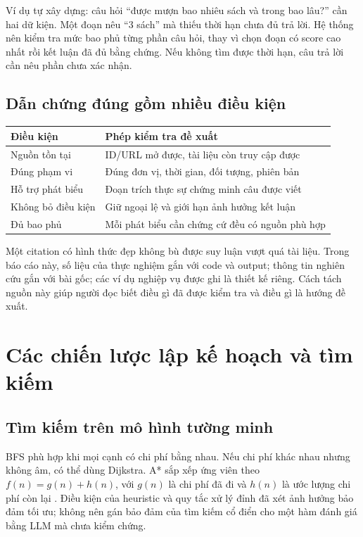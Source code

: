 Ví dụ tự xây dựng: câu hỏi ``được mượn bao nhiêu sách và trong bao lâu?'' cần hai dữ
kiện. Một đoạn nêu ``3 sách'' mà thiếu thời hạn chưa đủ trả lời. Hệ thống nên kiểm tra
mức bao phủ từng phần câu hỏi, thay vì chọn đoạn có score cao nhất rồi kết luận đã
đủ bằng chứng. Nếu không tìm được thời hạn, câu trả lời cần nêu phần chưa xác nhận.

\subsection{Dẫn chứng đúng gồm nhiều điều kiện}
\begin{center}\small
\begin{tabularx}{\linewidth}{@{}p{3.0cm}X@{}}\toprule
\textbf{Điều kiện} & \textbf{Phép kiểm tra đề xuất}\\\midrule
Nguồn tồn tại & ID/URL mở được, tài liệu còn truy cập được\\
Đúng phạm vi & Đúng đơn vị, thời gian, đối tượng, phiên bản\\
Hỗ trợ phát biểu & Đoạn trích thực sự chứng minh câu được viết\\
Không bỏ điều kiện & Giữ ngoại lệ và giới hạn ảnh hưởng kết luận\\
Đủ bao phủ & Mỗi phát biểu cần chứng cứ đều có nguồn phù hợp\\\bottomrule
\end{tabularx}\end{center}
Một citation có hình thức đẹp không bù được suy luận vượt quá tài liệu. Trong báo cáo
này, số liệu của thực nghiệm gắn với code và output; thông tin nghiên cứu gắn với bài
gốc; các ví dụ nghiệp vụ được ghi là thiết kế riêng. Cách tách nguồn này giúp người
đọc biết điều gì đã được kiểm tra và điều gì là hướng đề xuất.

\par
\section{Các chiến lược lập kế hoạch và tìm kiếm}
\subsection{Tìm kiếm trên mô hình tường minh}
BFS phù hợp khi mọi cạnh có chi phí bằng nhau. Nếu chi phí khác nhau nhưng không âm,
có thể dùng Dijkstra. A* sắp xếp ứng viên theo $f(n)=g(n)+h(n)$, với $g(n)$ là chi phí
đã đi và $h(n)$ là ước lượng chi phí còn lại \cite{astar}. Điều kiện của heuristic và quy tắc xử lý
đỉnh đã xét ảnh hưởng bảo đảm tối ưu; không nên gán bảo đảm của tìm kiếm cổ điển cho
một hàm đánh giá bằng LLM mà chưa kiểm chứng.

